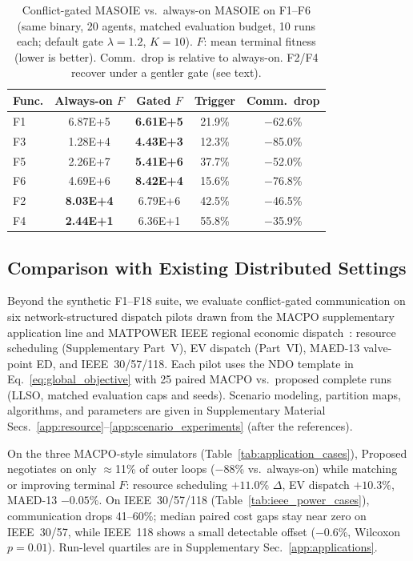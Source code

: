 \documentclass[conference]{IEEEtran}
\begin{document}
\begin{table}[!t]
\centering
\scriptsize
\setlength{\tabcolsep}{3.5pt}
\caption{Conflict-gated MASOIE vs.\ always-on MASOIE on F1--F6 (same binary, 20 agents, matched evaluation budget, 10 runs each; default gate $\lambda{=}1.2$, $K{=}10$). $F$: mean terminal fitness (lower is better). Comm.\ drop is relative to always-on. F2/F4 recover under a gentler gate (see text).}
\label{tab:masoie_gated}
\begin{tabular}{@{}lcccc@{}}
\toprule
\textbf{Func.} & \textbf{Always-on $F$} & \textbf{Gated $F$} & \textbf{Trigger} & \textbf{Comm.\ drop} \\
\midrule
F1 & 6.87E+5 & \textbf{6.61E+5} & 21.9\% & $-$62.6\% \\
F3 & 1.28E+4 & \textbf{4.43E+3} & 12.3\% & $-$85.0\% \\
F5 & 2.26E+7 & \textbf{5.41E+6} & 37.7\% & $-$52.0\% \\
F6 & 4.69E+6 & \textbf{8.42E+4} & 15.6\% & $-$76.8\% \\
\midrule
F2 & \textbf{8.03E+4} & 6.79E+6 & 42.5\% & $-$46.5\% \\
F4 & \textbf{2.44E+1} & 6.36E+1 & 55.8\% & $-$35.9\% \\
\bottomrule
\end{tabular}
\end{table}

\subsection{Comparison with Existing Distributed Settings}\label{sec:applications}\label{sec:exp_q4}
Beyond the synthetic F1--F18 suite, we evaluate conflict-gated communication on six network-structured dispatch pilots drawn from the MACPO supplementary application line and MATPOWER IEEE regional economic dispatch~\cite{ref_macpo}: resource scheduling (Supplementary Part~V), EV dispatch (Part~VI), MAED-13 valve-point ED, and IEEE~30/57/118. Each pilot uses the NDO template in Eq.~\eqref{eq:global_objective} with 25 paired MACPO vs.\ proposed complete runs (LLSO, matched evaluation caps and seeds). Scenario modeling, partition maps, algorithms, and parameters are given in Supplementary Material Secs.~\ref{app:resource}--\ref{app:scenario_experiments} (after the references).

On the three MACPO-style simulators (Table~\ref{tab:application_cases}), Proposed negotiates on only $\approx$11\% of outer loops ($-$88\% vs.\ always-on) while matching or improving terminal $F$: resource scheduling $+11.0\%$ $\Delta$, EV dispatch $+10.3\%$, MAED-13 $-0.05\%$. On IEEE~30/57/118 (Table~\ref{tab:ieee_power_cases}), communication drops 41--60\%; median paired cost gaps stay near zero on IEEE~30/57, while IEEE~118 shows a small detectable offset ($-$0.6\%, Wilcoxon $p{=}0.01$). Run-level quartiles are in Supplementary Sec.~\ref{app:applications}.
\end{document}
